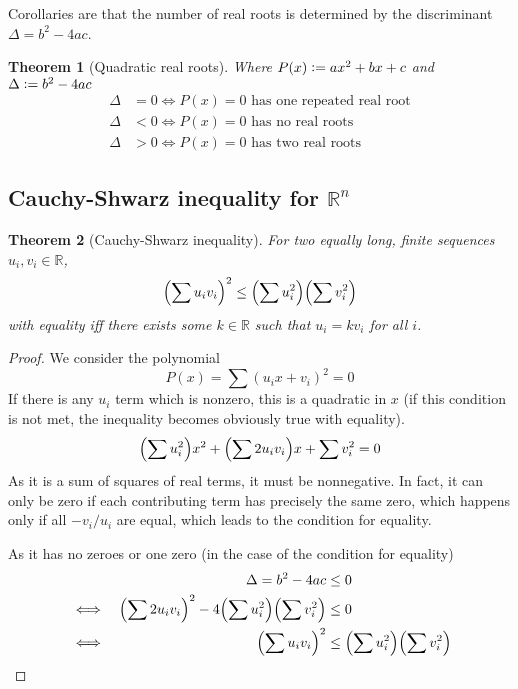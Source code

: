\documentclass[fleqn,a4paper,11pt]{article}
\newcommand{\defeq}{\vcentcolon=}
\newcommand{\setstyle}{\mathbb}
\newcommand{\Reals}{\setstyle R}
\newtheorem{theorem}{Theorem}[section]
\begin{document}
    Corollaries are that the number of real roots is determined by the
    discriminant \({\Delta = b^2 - 4ac}\).
    \begin{theorem}[Quadratic real roots]
    Where \(P(x) \defeq ax^2 + bx + c\) and \(\Delta \defeq b^2 - 4ac\)
    \begin{align*}
    \Delta &= 0 \iff \text{\(P(x) = 0\) has one repeated real root} \\
    \Delta &< 0 \iff \text{\(P(x) = 0\) has no real roots} \\
    \Delta &> 0 \iff \text{\(P(x) = 0\) has two real roots}
    \end{align*}
    \end{theorem}

    \subsection[Cauchy-Shwarz inequality for \(\Reals^n\)]
               {Cauchy-Shwarz inequality for \boldmath\(\Reals^n\)}

    \begin{theorem}[Cauchy-Shwarz inequality]
    For two equally long, finite sequences \(u_i, v_i \in \Reals\),
    \begin{equation*}
    \pqty{\sum u_i v_i}^2 \le \pqty{\sum u_i^2} \pqty{\sum v_i^2}
    \end{equation*}
    with equality iff there exists some \(k \in \Reals\) such that
    \(u_i = k v_i\) for all \(i\).
    \end{theorem}
    \begin{proof}
    We consider the polynomial
    \begin{equation*}
    P(x) = \sum (u_i x + v_i)^2 = 0
    \end{equation*}
    If there is any \(u_i\) term which is nonzero, this is a quadratic in \(x\)
    (if this condition is not met, the inequality becomes obviously true with
    equality).
    \begin{equation*}
    \pqty{\sum u_i^2} x^2 + \pqty{\sum 2 u_i v_i} x + \sum v_i^2 = 0
    \end{equation*}
    As it is a sum of squares of real terms, it must be nonnegative. In fact, it
    can only be zero if each contributing term has precisely the same zero,
    which happens only if all \(-v_i/u_i\) are equal, which leads to the
    condition for equality.

    As it has no zeroes or one zero (in the case of the condition for equality)
    \begin{alignat*}{2}
    &&\Delta = b^2 - 4ac &\le 0 \\
    &\iff&
    \pqty{\sum 2 u_i v_i}^2 - 4\pqty{\sum u_i^2}\pqty{\sum v_i^2} &\le 0 \\
    &\iff& \pqty{\sum u_i v_i}^2 &\le \pqty{\sum u_i^2} \pqty{\sum v_i^2}
        \qedhere
    \end{alignat*}
    \end{proof}
\end{document}
